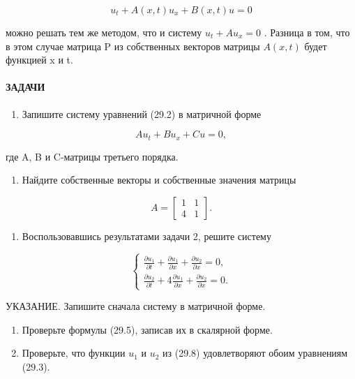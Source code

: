 \documentclass[
  ukrainian,
]{article}
\providecommand{\tightlist}{%
  \setlength{\itemsep}{0pt}\setlength{\parskip}{0pt}}
\begin{document}
\[
u_t + A(x, t) u_x + B(x, t) u = 0
\]

можно решать тем же методом, что и систему \(u_t + Au_x = 0\) . Разница
в том, что в этом случае матрица P из собственных векторов матрицы
\(A(x, t)\) будет функцией x и t.

\paragraph{ЗАДАЧИ}\label{ux437ux430ux434ux430ux447ux438-5}

\begin{enumerate}
\def\labelenumi{\arabic{enumi}.}
\tightlist
\item
  Запишите систему уравнений (29.2) в матричной форме
\end{enumerate}

\[
Au_t + Bu_x + Cu = 0,
\]

где A, B и C-матрицы третьего порядка.

\begin{enumerate}
\def\labelenumi{\arabic{enumi}.}
\setcounter{enumi}{1}
\tightlist
\item
  Найдите собственные векторы и собственные значения матрицы
\end{enumerate}

\[
A = \begin{bmatrix} 1 & 1 \\ 4 & 1 \end{bmatrix}.
\]

\begin{enumerate}
\def\labelenumi{\arabic{enumi}.}
\setcounter{enumi}{2}
\tightlist
\item
  Воспользовавшись результатами задачи 2, решите систему
\end{enumerate}

\[
\begin{cases} \frac{\partial u_1}{\partial t} + \frac{\partial u_1}{\partial x} + \frac{\partial u_2}{\partial x} = 0, \\ \frac{\partial u_2}{\partial t} + 4 \frac{\partial u_1}{\partial x} + \frac{\partial u_2}{\partial x} = 0. \end{cases}
\]

УКАЗАНИЕ. Запишите сначала систему в матричной форме.

\begin{enumerate}
\def\labelenumi{\arabic{enumi}.}
\setcounter{enumi}{3}
\item
  Проверьте формулы (29.5), записав их в скалярной форме.
\item
  Проверьте, что функции \(u_1\) и \(u_2\) из (29.8) удовлетворяют обоим
  уравнениям (29.3).
\end{enumerate}
\end{document}
